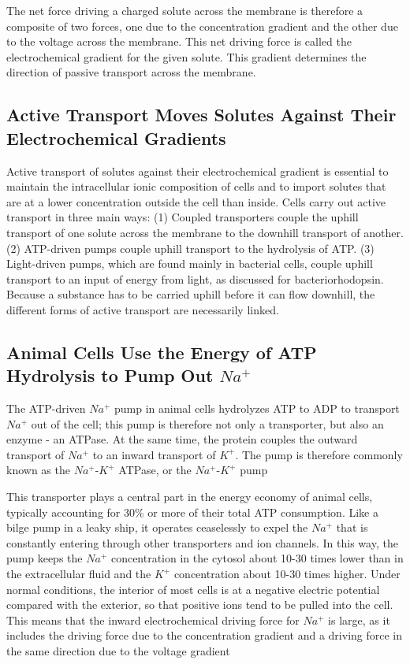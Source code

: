 The net force driving a charged solute across the membrane is therefore
a composite of two forces, one due to the concentration gradient and the
other due to the voltage across the membrane. This net driving force is
called the electrochemical gradient for the given solute. This gradient
determines the direction of passive transport across the membrane.

\subsection{Active Transport Moves Solutes Against Their Electrochemical Gradients}

Active transport of solutes against their electrochemical gradient is essential to maintain
the intracellular ionic composition of cells and to import solutes that are
at a lower concentration outside the cell than inside. Cells carry out active
transport in three main ways: (1) Coupled transporters couple
the uphill transport of one solute across the membrane to the downhill
transport of another. (2) ATP-driven pumps couple uphill transport to the
hydrolysis of ATP. (3) Light-driven pumps, which are found mainly in bacterial
cells, couple uphill transport to an input of energy from light, as
discussed for bacteriorhodopsin.
Because a substance has to be carried uphill before it can flow downhill,
the different forms of active transport are necessarily linked.

\subsection{Animal Cells Use the Energy of ATP Hydrolysis to Pump Out $Na^{+}$}

The ATP-driven $Na^{+}$ pump in animal cells hydrolyzes ATP to ADP to transport
$Na^{+}$ out of the cell; this pump is therefore not only a transporter,
but also an enzyme - an ATPase. At the same time, the protein couples
the outward transport of $Na^{+}$ to an inward transport of $K^{+}$. The pump is
therefore commonly known as the $Na^{+}$-$K^{+}$ ATPase, or the $Na^{+}$-$K^{+}$ pump

This transporter plays a central part in the energy economy of animal
cells, typically accounting for 30\% or more of their total ATP consumption.
Like a bilge pump in a leaky ship, it operates ceaselessly to expel the
$Na^{+}$ that is constantly entering through other transporters and ion channels.
In this way, the pump keeps the $Na^{+}$ concentration in the cytosol
about 10-30 times lower than in the extracellular fluid and the $K^{+}$ concentration
about 10-30 times higher. Under normal
conditions, the interior of most cells is at a negative electric potential
compared with the exterior, so that positive ions tend to be pulled into
the cell. This means that the inward electrochemical driving force for $Na^{+}$
is large, as it includes the driving force due to the concentration gradient
and a driving force in the same direction due to the voltage gradient

